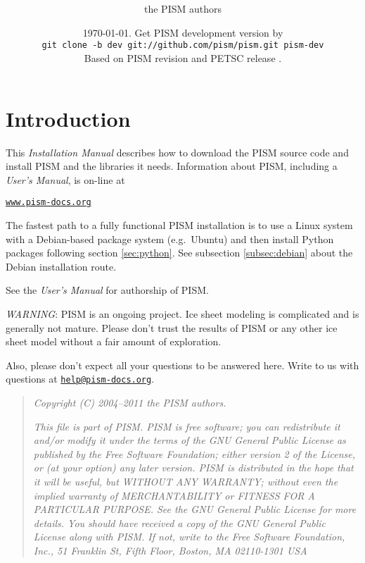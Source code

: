 \documentclass[11pt,final]{amsart}
\title[PISM Installation Manual]{\protect{\Large \emph{PISM}, a Parallel Ice
    Sheet Model:\normalsize} \\ \protect{\Large \bigskip \bigskip Installation
    Manual\normalsize}}
\author[]{the PISM authors}
\date{\today.  Get PISM development version by \\
\phantom{foobar} \qquad\texttt{git clone -b dev git://github.com/pism/pism.git pism-dev} \\
Based on PISM revision \PISMREV\quad and PETSC release \PETSCREL.}
\renewcommand{\t}[1]{\texttt{#1}}
\begin{document}
\maketitle
\thispagestyle{empty}

\vspace{1.5in}
\setcounter{tocdepth}{2}
\tableofcontents



\newpage
\section*{Introduction}

\large
This \emph{Installation Manual} describes how to download the PISM source code and install PISM and the libraries it needs.  Information about PISM, including a \emph{User's Manual}, is on-line at
\bigskip
\begin{center}
  \href{http://www.pism-docs.org}{\t{www.pism-docs.org}}
\end{center}
\bigskip
\noindent The fastest path to a fully functional PISM installation is to use a Linux system with a Debian-based package system (e.g.~Ubuntu) and then install Python packages following section \ref{sec:python}.  See subsection \ref{subsec:debian} about the Debian installation route.

\bigskip
See the \emph{User's Manual} for authorship of PISM.
\vfill

\large
\begin{center}
\parbox{5.5in}{ \emph{WARNING}:  PISM is an ongoing project.  Ice sheet modeling is complicated and is generally not mature.  Please don't trust the results of PISM or any other ice sheet model without a fair amount of exploration.

\bigskip
Also, please don't expect all your questions to be answered here.  Write to us with questions at \href{mailto:help@pism-docs.org}{\texttt{help@pism-docs.org}}.}
\normalsize
\end{center}
\normalsize
\vfill

\begin{quote}
\textsl{Copyright (C) 2004--2011 the PISM authors.}
\medskip

\noindent \textsl{This file is part of PISM.  PISM is free software; you can redistribute it and/or modify it under the terms of the GNU General Public
  License as published by the Free Software Foundation; either version 2 of the License, or (at your option) any later version.  PISM is distributed in the hope that it will be useful, but WITHOUT ANY WARRANTY; without even the implied
  warranty of MERCHANTABILITY or FITNESS FOR A PARTICULAR PURPOSE. See the GNU General Public License for more details.  You should have received a copy of the GNU General Public License along with PISM. If not, write to the Free Software Foundation, Inc., 51 Franklin St, Fifth Floor, Boston, MA 02110-1301 USA}
\end{quote}
\end{document}

